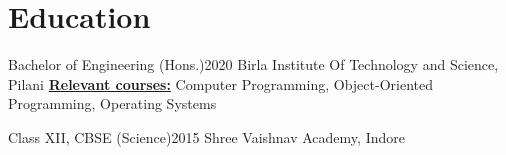 \section{Education}
  \resumeSubHeadingListStart
    \resumeSubheading
      {Bachelor of Engineering (Hons.)}{2020}
      \resumeSubSubheadingSmall
      {Birla Institute Of Technology and Science, Pilani}
      {\underline{\textbf{Relevant courses:}} Computer Programming, Object-Oriented Programming, Operating Systems}
  


    \resumeSubheading
      {Class XII, CBSE (Science)}{2015}
      \resumeSubSubheadingSmall
      {Shree Vaishnav Academy, Indore}{}
  \resumeSubHeadingListEnd
